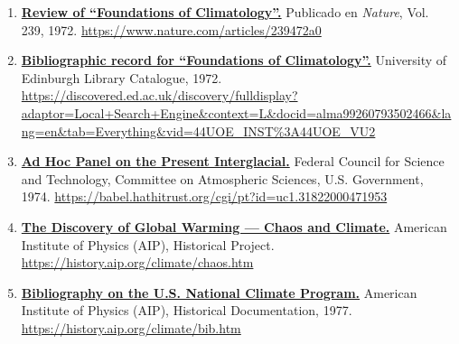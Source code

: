 \documentclass[
  10pt,
  a4paper,
  DIV=11,
  numbers=noendperiod,
  open=any]{scrreprt}
\numberwithin{equation}{chapter}
\numberwithin{equation}{section}
\renewcommand{\[}{\begin{equation}}
\renewcommand{\]}{\end{equation}}
\begin{document}
\begin{enumerate}
\item \label{ref:web42}\href{https://www.nature.com/articles/239472a0}{\textbf{Review of “Foundations of Climatology”.}} Publicado en \textit{Nature}, Vol. 239, 1972.  
\url{https://www.nature.com/articles/239472a0}

\item \label{ref:web43}\href{https://discovered.ed.ac.uk/discovery/fulldisplay?adaptor=Local+Search+Engine&context=L&docid=alma99260793502466&lang=en&tab=Everything&vid=44UOE_INST%3A44UOE_VU2}{\textbf{Bibliographic record for “Foundations of Climatology”.}} University of Edinburgh Library Catalogue, 1972.  
\url{https://discovered.ed.ac.uk/discovery/fulldisplay?adaptor=Local+Search+Engine&context=L&docid=alma99260793502466&lang=en&tab=Everything&vid=44UOE_INST%3A44UOE_VU2}

\item \label{ref:web44}\href{https://babel.hathitrust.org/cgi/pt?id=uc1.31822000471953}{\textbf{Ad Hoc Panel on the Present Interglacial.}} Federal Council for Science and Technology, Committee on Atmospheric Sciences, U.S. Government, 1974.  
\url{https://babel.hathitrust.org/cgi/pt?id=uc1.31822000471953}

\item \label{ref:web45}\href{https://history.aip.org/climate/chaos.htm}{\textbf{The Discovery of Global Warming — Chaos and Climate.}} American Institute of Physics (AIP), Historical Project.  
\url{https://history.aip.org/climate/chaos.htm}

\item \label{ref:web46}\href{https://history.aip.org/climate/bib.htm}{\textbf{Bibliography on the U.S. National Climate Program.}} American Institute of Physics (AIP), Historical Documentation, 1977.  
\url{https://history.aip.org/climate/bib.htm}


\end{enumerate}
\end{document}
